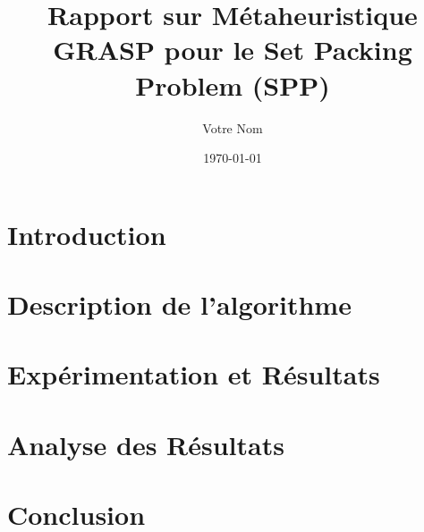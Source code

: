 \documentclass[12pt]{article}
\title{Rapport sur Métaheuristique GRASP pour le Set Packing Problem (SPP)}
\author{Votre Nom}
\date{\today}
\begin{document}
\maketitle

\section{Introduction}

\section{Description de l'algorithme}

\section{Expérimentation et Résultats}

\section{Analyse des Résultats}

\section{Conclusion}
\end{document}

